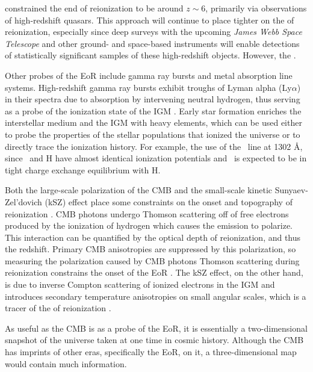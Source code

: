 \documentclass[12pt]{article}
\begin{document}
\cite{fan2006} constrained the end of reionization to be around $z \sim 6$, primarily via observations of high-redshift quasars. This approach will continue to place tighter  on the  of reionization, especially since deep surveys with the upcoming \textit{James Webb Space Telescope} and other ground- and space-based instruments will enable detections of statistically significant samples of these high-redshift objects. However, the .

Other probes of the EoR include gamma ray bursts and metal absorption line systems. High-redshift gamma ray bursts exhibit troughs  of Lyman alpha (Ly$\alpha$) in their spectra due to absorption by intervening neutral hydrogen, thus serving as a probe of the ionization state of the IGM \citep[e.g.,][]{gallerani2008}. Early star formation enriches the interstellar medium and the IGM with heavy elements, which can be used either to probe the properties of the stellar populations that ionized the universe or to directly trace the ionization history. For example, \cite{oh2002}  the use of the \OI~line at 1302 \AA, since \OI~and H have almost identical ionization potentials and \OI~is expected to be in tight charge exchange equilibrium with H.

Both the large-scale polarization of the CMB and the small-scale kinetic Sunyaev-Zel'dovich (kSZ) effect place some constraints on the onset and topography of reionization \citep{fan2006}. CMB photons undergo Thomson scattering off of free electrons produced by the ionization of hydrogen which causes the emission to polarize. This interaction can be quantified by the optical depth of reionization, and thus the redshift. Primary CMB anisotropies are suppressed by this polarization, so measuring the polarization caused by CMB photons Thomson scattering during reionization constrains the onset of the EoR \citep[e.g.,][]{zaldarriaga1997, roy2018}. The kSZ effect, on the other hand, is due to inverse Compton scattering of ionized electrons in the IGM and introduces secondary temperature anisotropies on small angular scales, which is a tracer of the  of reionization \citep{fan2006, park2013, roy2018}.

As useful as the CMB is as a probe of the EoR, it is essentially a two-dimensional snapshot of the universe taken at one time in cosmic history. Although the CMB has imprints of other eras, specifically the EoR, on it, a three-dimensional map would contain much information. 
\end{document}
